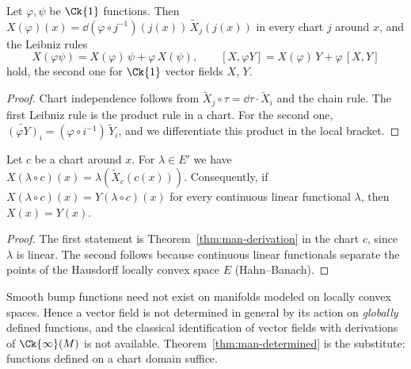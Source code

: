 \begin{theorem}
  \label{thm:man-derivation}
  \leanok
  Let $\varphi, \psi$ be $\Ck{1}$ functions. Then $X(\varphi)(x) = \dd(\varphi \circ
  j^{-1})(j(x))\,\widetilde{X}_j(j(x))$ in every chart $j$ around $x$, and the Leibniz rules
  \[
    X(\varphi\psi) = X(\varphi)\,\psi + \varphi\,X(\psi), \qquad
    [X, \varphi Y] = X(\varphi)\,Y + \varphi\,[X, Y]
  \]
  hold, the second one for $\Ck{1}$ vector fields $X$, $Y$.
\end{theorem}

\begin{proof}
  \leanok
  Chart independence follows from $\widetilde{X}_j \circ \tau = \dd\tau \cdot \widetilde{X}_i$
  and the chain rule. The first Leibniz rule is the product rule in a chart. For the second one,
  $\widetilde{(\varphi Y)}_i = (\varphi \circ i^{-1})\,\widetilde{Y}_i$, and we differentiate this
  product in the local bracket.
\end{proof}

\begin{theorem}
  \label{thm:man-determined}
  \leanok
  Let $c$ be a chart around $x$. For $\lambda \in E'$ we have $X(\lambda \circ c)(x) =
  \lambda(\widetilde{X}_c(c(x)))$. Consequently, if $X(\lambda \circ c)(x) = Y(\lambda \circ c)(x)$
  for every continuous linear functional $\lambda$, then $X(x) = Y(x)$.
\end{theorem}

\begin{proof}
  \leanok
  The first statement is Theorem~\ref{thm:man-derivation} in the chart $c$, since $\lambda$ is
  linear. The second follows because continuous linear functionals separate the points of the
  Hausdorff locally convex space $E$ (Hahn--Banach).
\end{proof}

\begin{remark}
  \label{rem:man-no-bumps}
  Smooth bump functions need not exist on manifolds modeled on locally convex spaces. Hence a vector field is not determined in general by its
  action on \emph{globally} defined functions, and the classical identification of vector fields
  with derivations of $\Ck{\infty}(M)$ is not available. Theorem~\ref{thm:man-determined} is the
  substitute: functions defined on a chart domain suffice.
\end{remark}

